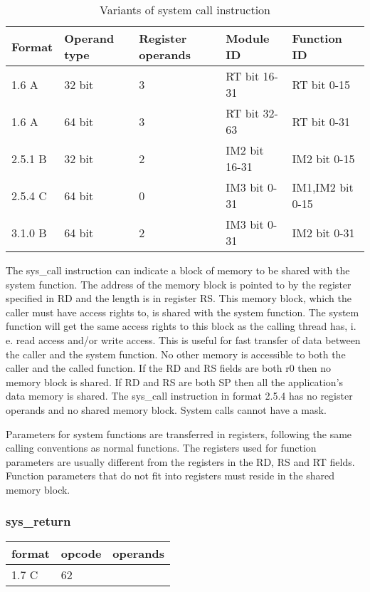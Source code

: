 \documentclass[forwardcom.tex]{subfiles}
\begin{document}
\begin{longtable}
{|p{20mm}|p{20mm}|p{20mm}|p{30mm}|p{30mm}|}
\caption{Variants of system call instruction}
\label{table:sysCallInstruction}
\endfirsthead
\endhead
\hline
Format & Operand type & Register operands & Module ID & Function ID \\
\hline
1.6 A & 32 bit & 3 & RT bit 16-31 & RT bit 0-15 \\
\hline
1.6 A & 64 bit & 3 & RT bit 32-63 & RT bit 0-31 \\
\hline
2.5.1 B & 32 bit & 2 & IM2 bit 16-31 & IM2 bit 0-15\\
\hline
2.5.4 C & 64 bit & 0  & IM3 bit 0-31 & IM1,IM2 bit 0-15 \\
\hline
3.1.0 B & 64 bit & 2  & IM3 bit 0-31 & IM2 bit 0-31 \\
\hline
\end{longtable}

The sys\_call instruction can indicate a block of memory to be shared with the system function. The address of the memory block is pointed to by the register specified in RD and the length is in register RS. This memory block, which the caller must have access rights to, is shared with the system function. The system function will get the same access rights to this block as the calling thread has, i. e. read access and/or write access. This is useful for fast transfer of data between the caller and the system function. No other memory is accessible to both the caller and the called function. If the RD and RS fields are both r0 then no memory block is shared. If RD and RS are both SP then all the application's data memory is shared. The sys\_call instruction in format 2.5.4 has no register operands and no shared memory block. System calls cannot have a mask.
\vspace{2mm}

Parameters for system functions are transferred in registers, following the same calling conventions as normal functions. The registers used for function parameters are usually different from the registers in the RD, RS and RT fields. Function parameters that do not fit into registers must reside in the shared memory block.


\subsubsection{sys\_return}
\label{table:sysCallInstruction}
\begin{tabular}{|p{12mm}|p{12mm}|p{110mm}|}
\hline
\bfseries format & \bfseries opcode & \bfseries operands \\ \hline
1.7 C & 62 & \\ \hline
\end{tabular}
\vspace{2mm}
\end{document}

